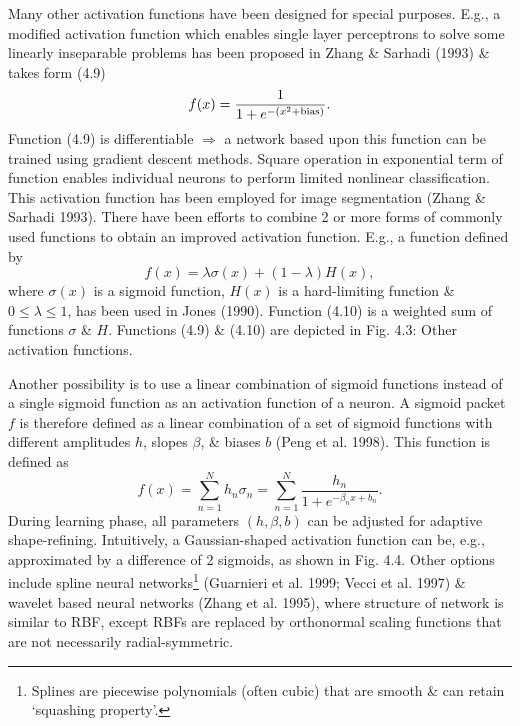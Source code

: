 \documentclass{article}
\begin{document}
\begin{enumerate}
\begin{itemize}
\begin{itemize}
			Many other activation functions have been designed for special purposes. E.g., a modified activation function which enables single layer perceptrons to solve some linearly inseparable problems has been proposed in Zhang \& Sarhadi (1993) \& takes form (4.9)
			\begin{equation}
				f(x) = \frac{1}{1 + e^{-(x^2 + {\rm bias})}}.
			\end{equation}
			Function (4.9) is differentiable $\Rightarrow$ a network based upon this function can be trained using gradient descent methods. Square operation in exponential term of function enables individual neurons to perform limited nonlinear classification. This activation function has been employed for image segmentation (Zhang \& Sarhadi 1993). There have been efforts to combine 2 or more forms of commonly used functions to obtain an improved activation function. E.g., a function defined by
			\begin{equation}
				f(x) = \lambda\sigma(x) + (1 - \lambda)H(x),
			\end{equation}
			where $\sigma(x)$ is a sigmoid function, $H(x)$ is a hard-limiting function \& $0\le\lambda\le1$, has been used in Jones (1990). Function (4.10) is a weighted sum of functions $\sigma$ \& $H$. Functions (4.9) \& (4.10) are depicted in {\sf Fig. 4.3: Other activation functions}.
			
			Another possibility is to use a linear combination of sigmoid functions instead of a single sigmoid function as an activation function of a neuron. A sigmoid packet $f$ is therefore defined as a linear combination of a set of sigmoid functions with different amplitudes $h$, slopes $\beta$, \& biases $b$ (Peng et al. 1998). This function is defined as
			\begin{equation}
				f(x) = \sum_{n=1}^N h_n\sigma_n = \sum_{n=1}^N \frac{h_n}{1 + e^{-\beta_nx + b_n}}.
			\end{equation}
			During learning phase, all parameters $(h,\beta,b)$ can be adjusted for adaptive shape-refining. Intuitively, a Gaussian-shaped activation function can be, e.g., approximated by a difference of 2 sigmoids, as shown in Fig. 4.4. Other options include spline neural networks\footnote{Splines are piecewise polynomials (often cubic) that are smooth \& can retain `squashing property'.} (Guarnieri et al. 1999; Vecci et al. 1997) \& wavelet based neural networks (Zhang et al. 1995), where structure of network is similar to RBF, except RBFs are replaced by orthonormal scaling functions that are not necessarily radial-symmetric.
			

\end{itemize}
\end{itemize}
\end{enumerate}
\end{document}
